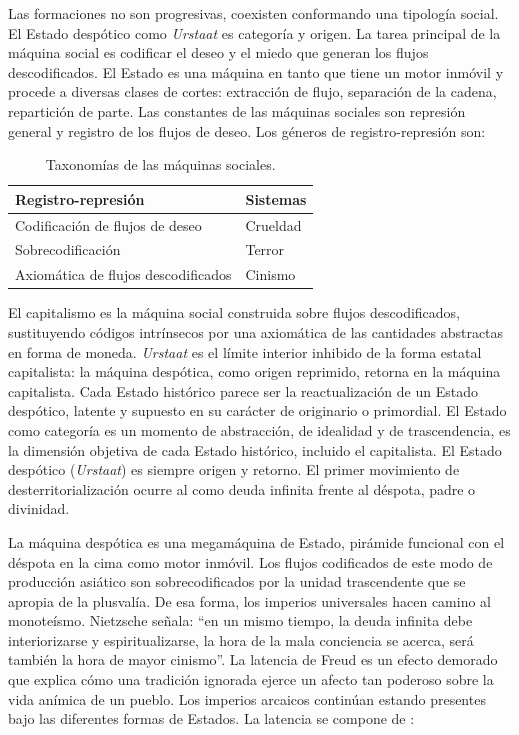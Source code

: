 Las formaciones no son progresivas, coexisten conformando una tipología social. El Estado despótico como \emph{Urstaat} es categoría y origen. La tarea principal de la máquina social es codificar el deseo y el miedo que generan los flujos descodificados. El Estado es una máquina en tanto que tiene un motor inmóvil y procede a diversas clases de cortes: extracción de flujo, separación de la cadena, repartición de parte. Las constantes de las máquinas sociales son represión general y registro de los flujos de deseo. Los géneros de registro-represión son:

\begin{table}[htb]
  \caption{Taxonomías de las máquinas sociales.} %
  \label{tab:tablename}
  \centering
  \begin{tabular}{ll}
    \toprule
    \textbf{Registro-represión} & \textbf{Sistemas}\\
    \midrule
    Codificación de flujos de deseo & Crueldad\\
    Sobrecodificación & Terror\\
    Axiomática de flujos descodificados & Cinismo\\
\bottomrule
  \end{tabular}
\end{table}

El capitalismo es la máquina social construida sobre flujos descodificados, sustituyendo códigos intrínsecos por una axiomática de las cantidades abstractas en forma de moneda. \emph{Urstaat} es el límite interior inhibido de la forma estatal capitalista: la máquina despótica, como origen reprimido, retorna en la máquina capitalista. Cada Estado histórico parece ser la reactualización de un Estado despótico, latente y supuesto en su carácter de originario o primordial. El Estado como categoría es un momento de abstracción, de idealidad y de trascendencia, es la dimensión objetiva de cada Estado histórico, incluido el capitalista. El Estado despótico (\emph{Urstaat}) es siempre origen y retorno. El primer movimiento de desterritorialización ocurre al  como deuda infinita frente al déspota, padre o divinidad.

La máquina despótica es una megamáquina de Estado, pirámide funcional con el déspota en la cima como motor inmóvil. Los flujos codificados de este modo de producción asiático son sobrecodificados por la unidad trascendente que se apropia de la plusvalía. De esa forma, los imperios universales hacen camino al monoteísmo. Nietzsche señala: \enquote{en un mismo tiempo, la deuda infinita debe interiorizarse y espiritualizarse, la hora de la mala conciencia se acerca, será también la hora de mayor cinismo}. La latencia de Freud es un efecto demorado que explica cómo una tradición ignorada ejerce un afecto tan poderoso sobre la vida anímica de un pueblo. Los imperios arcaicos continúan estando presentes bajo las diferentes formas de Estados. La latencia se compone de \autocite{deleuzeAntiedipoCapitalismoEsquizofrenia2017}:

